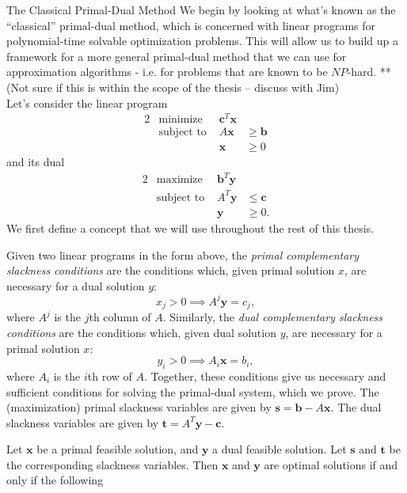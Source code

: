 \documentclass[11pt]{article}
\renewcommand{\'}{^{'}}
\newenvironment{theorem}[2][Theorem]{\begin{trivlist}
\item[\hskip \labelsep {\bfseries #1}\hskip \labelsep {\bfseries #2.}]}{\end{trivlist}}
\newenvironment{definition}[2][Definition]{\begin{trivlist}
\item[\hskip \labelsep {\bfseries #1}\hskip \labelsep {\bfseries #2.}]}{\end{trivlist}}
\begin{document}
\begin{section}{The Classical Primal-Dual Method}
	We begin by looking at what's known as the ``classical'' primal-dual method, which is concerned 
	with linear programs for polynomial-time solvable optimization problems. This will allow us 
	to build up a framework for a more general primal-dual method that we can use for approximation 
	algorithms - i.e. for problems that are known to be $NP$-hard. **(Not sure if this is within the 
	scope of the thesis -- discuss with Jim)\\
	Let's consider the linear program
	\begin{alignat}{2}
		& \text{minimize} & \mathbf{c}^{T}\mathbf{x} \\
		& \text{subject to } & A\mathbf{x} & \geq \mathbf{b} \\
		&& \mathbf{x} & \geq 0
	\end{alignat}
	and its dual
	\begin{alignat}{2}
		& \text{maximize} & \mathbf{b}^{T}\mathbf{y} \\
		& \text{subject to } & A^{T}\mathbf{y} & \leq \mathbf{c} \\
		&& \mathbf{y} & \geq 0.
	\end{alignat}
	We first define a concept that we will use throughout the rest of this thesis. 
	\begin{definition}{(Complementary slackness)}
		Given two linear programs in the form above, the \emph{primal complementary slackness 
		conditions} are the conditions which, given primal solution $x$, are necessary for 
		a dual solution $y$:
		\[
			x_j > 0 \implies A^{j}\mathbf{y} = c_j,
		\]
		where $A^{j}$ is the $j$th column of $A$. Similarly, the \emph{dual complementary 
		slackness conditions} are the conditions which, given dual solution $y$, are 
		necessary for a primal solution $x$:
		\[
			y_i > 0 \implies A_i\mathbf{x} = b_i,
		\]
		where $A_i$ is the $i$th row of $A$. Together, these conditions give us necessary and 
		sufficient conditions for solving the primal-dual system, which we prove. The 
		(maximization) primal slackness variables are given by 
		$\mathbf{s} = \mathbf{b} - A\mathbf{x}$. The dual slackness variables are given by 
		$\mathbf{t} = A^{T}\mathbf{y} - \mathbf{c}$.
	\end{definition}
	\begin{theorem}{}
		Let $\mathbf{x}$ be a primal feasible solution, and $\mathbf{y}$ a dual feasible 
		solution. Let $\mathbf{s}$ and $\mathbf{t}$ be the corresponding slackness variables. 
		Then $\mathbf{x}$ and $\mathbf{y}$ are optimal solutions if and only if the following 

\end{theorem}
\end{section}
\end{document}
